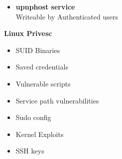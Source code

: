 \documentclass[a4paper,10pt]{article}
\begin{document}
\begin{multicols}{2}
\begin{tcolorbox}[breakable,title=Windows XP]
\begin{itemize}
	\itemsep0em
	\item \textbf{upnphost service}\\Writeable by Authenticated users
\end{itemize}
\end{tcolorbox}
\begin{tcolorbox}[breakable,title=Windows Vista]
	
\end{tcolorbox}
\begin{tcolorbox}[breakable,title=Windows 7]
	
\end{tcolorbox}
\begin{tcolorbox}[breakable,title=Windows 8]
	
\end{tcolorbox}
\begin{tcolorbox}[breakable,title=Windows 8.1]
	
\end{tcolorbox}
\begin{tcolorbox}[breakable,title=Windows 10]
	
\end{tcolorbox}
\begin{tcolorbox}[breakable,title=Windows Server 2003]
	
\end{tcolorbox}
\begin{tcolorbox}[breakable,title=Windows Server 2008/R2]
	
\end{tcolorbox}
\begin{tcolorbox}[breakable,title=Windows Server 2012]
	
\end{tcolorbox}
\begin{tcolorbox}[breakable,title=Windows Server 2016]
	
\end{tcolorbox}
\begin{tcolorbox}[breakable,title=Windows Server 2019]
	
\end{tcolorbox}
\end{multicols}
\newpage
\Huge{\textbf{Linux Privesc}}
\newline
\normalsize
\begin{tcolorbox}[breakable,title=checklist]
\begin{itemize}
	\itemsep0em
	\item SUID Binaries
	\item Saved credentials
	\item Vulnerable scripts
	\item Service path vulnerabilities
	\item Sudo config
	\item Kernel Exploits
	\item SSH keys
\end{itemize}
\end{tcolorbox}
\end{document}
